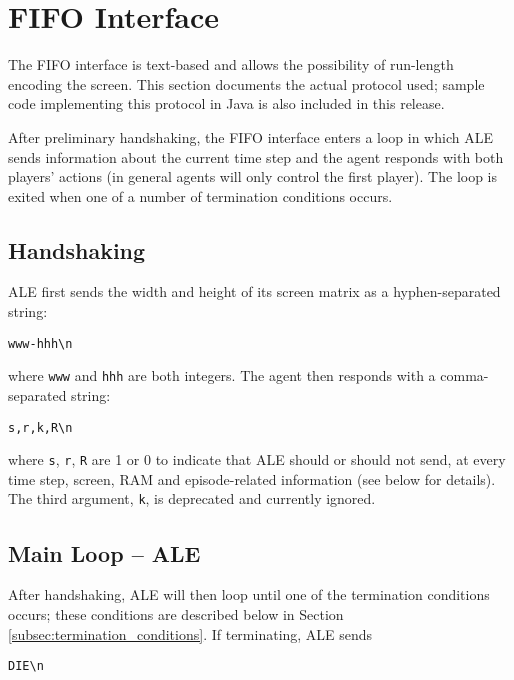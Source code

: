 \documentclass[12pt]{article}
\begin{document}
\section{FIFO Interface}\label{sec:pipes_interface}

The FIFO interface is text-based and allows the possibility of run-length encoding the screen. This section documents the actual protocol used; sample code implementing this protocol in Java is also included in this release.

After preliminary handshaking, the FIFO interface enters a loop in which ALE sends information about the current time step and the agent responds with both players' actions (in general agents will only control the first player). The loop is exited when one of a number of termination conditions occurs.

\subsection{Handshaking}

ALE first sends the width and height of its screen matrix as a hyphen-separated string:

\begin{verbatim}
www-hhh\n
\end{verbatim}

\noindent where \verb+www+ and \verb+hhh+ are both integers. The agent then responds with a comma-separated string:

\begin{verbatim}
s,r,k,R\n
\end{verbatim}

\noindent where \verb+s+, \verb+r+, \verb+R+ are 1 or 0 to indicate that ALE should or should not send, at every time step, screen, RAM and episode-related information (see below for details). The third argument, \verb+k+, is deprecated and currently ignored.

\subsection{Main Loop -- ALE}

After handshaking, ALE will then loop until one of the termination conditions occurs; these conditions are described below in Section \ref{subsec:termination_conditions}. If terminating, ALE sends

\begin{verbatim}
DIE\n
\end{verbatim}
\end{document}
